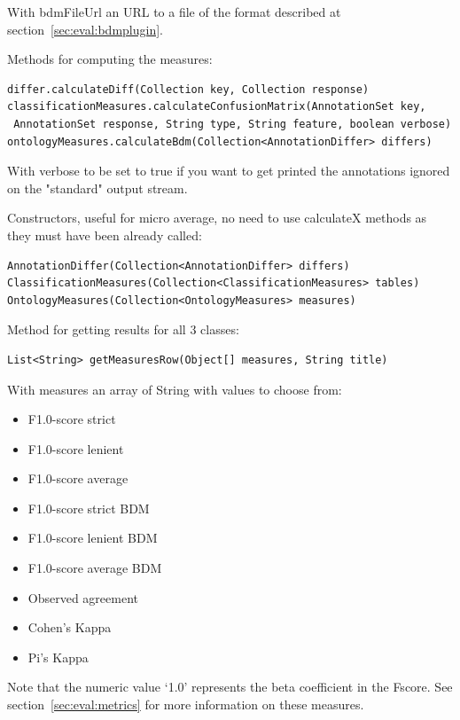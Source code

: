 With bdmFileUrl an URL to a file of the format described at
section~\ref{sec:eval:bdmplugin}.

Methods for computing the measures:
\begin{small}\begin{verbatim}
differ.calculateDiff(Collection key, Collection response)
classificationMeasures.calculateConfusionMatrix(AnnotationSet key,
 AnnotationSet response, String type, String feature, boolean verbose)
ontologyMeasures.calculateBdm(Collection<AnnotationDiffer> differs)
\end{verbatim}\end{small}

With verbose to be set to true if you want to get printed the annotations
ignored on the "standard" output stream.

Constructors, useful for micro average, no need to use calculateX methods
as they must have been already called:
\begin{small}\begin{verbatim}
AnnotationDiffer(Collection<AnnotationDiffer> differs)
ClassificationMeasures(Collection<ClassificationMeasures> tables)
OntologyMeasures(Collection<OntologyMeasures> measures)
\end{verbatim}\end{small}

Method for getting results for all 3 classes:
\begin{small}\begin{verbatim}
List<String> getMeasuresRow(Object[] measures, String title)
\end{verbatim}\end{small}

With measures an array of String with values to choose from:
\begin{itemize}
\item F1.0-score strict
\item F1.0-score lenient
\item F1.0-score average
\item F1.0-score strict BDM
\item F1.0-score lenient BDM
\item F1.0-score average BDM
\item Observed agreement
\item Cohen's Kappa
\item Pi's Kappa
\end{itemize}

Note that the numeric value `1.0' represents the beta coefficient in the Fscore.
See section~\ref{sec:eval:metrics} for more information on these measures.

